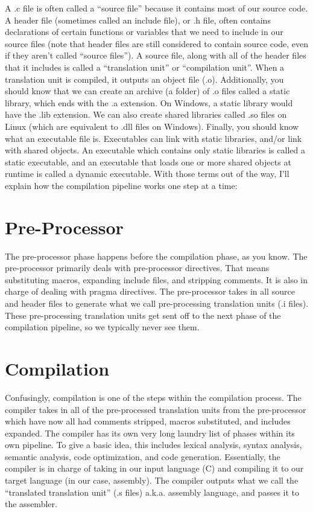 \documentclass{article}
\begin{document}
A .c file is often called a “source file” because it contains most of our source code. A header file
(sometimes called an include file), or .h file, often contains declarations of certain functions or variables
that we need to include in our source files (note that header files are still considered to contain source
code, even if they aren’t called “source files”). A source file, along with all of the header files that it
includes is called a “translation unit” or “compilation unit”. When a translation unit is compiled, it
outputs an object file (.o). Additionally, you should know that we can create an archive (a folder) of .o
files called a static library, which ends with the .a extension. On Windows, a static library would have the
.lib extension. We can also create shared libraries called .so files on Linux (which are equivalent to .dll
files on Windows). Finally, you should know what an executable file is. Executables can link with static
libraries, and/or link with shared objects. An executable which contains only static libraries is called a
static executable, and an executable that loads one or more shared objects at runtime is called a dynamic
executable. With those terms out of the way, I’ll explain how the compilation pipeline works one step at a
time:

\section{Pre-Processor}

The pre-processor phase happens before the compilation phase, as you know. The pre-processor primarily deals
with pre-processor directives. That means substituting macros, expanding include files, and stripping comments.
It is also in charge of dealing with pragma directives. The pre-processor takes in all source and header
files to generate what we call pre-processing translation units (.i files). These pre-processing translation
units get sent off to the next phase of the compilation pipeline, so we typically never see them.

\section{Compilation}

Confusingly, compilation is one of the steps within the compilation process. The compiler takes in all of the
pre-processed translation units from the pre-processor which have now all had comments stripped, macros
substituted, and includes expanded. The compiler has its own very long laundry list of phases within its own
pipeline. To give a basic idea, this includes lexical analysis, syntax analysis, semantic analysis, code
optimization, and code generation. Essentially, the compiler is in charge of taking in our input language (C)
and compiling it to our target language (in our case, assembly). The compiler outputs what we call the
“translated translation unit” (.s files) a.k.a. assembly language, and passes it to the assembler.
\end{document}
